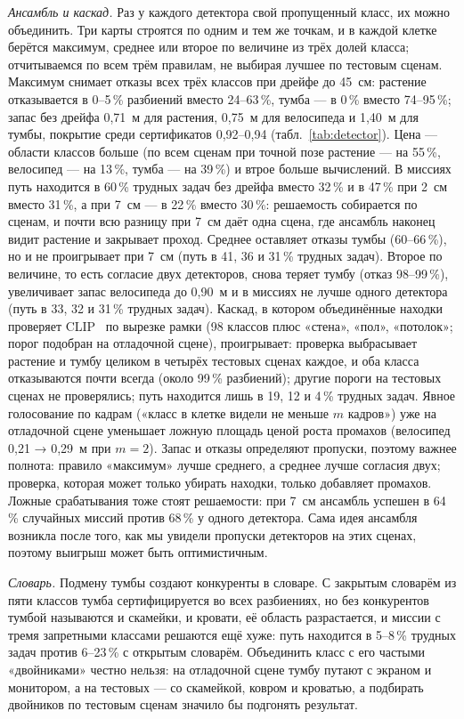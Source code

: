 \emph{Ансамбль и каскад.} Раз у каждого детектора свой пропущенный класс, их можно объединить. Три карты строятся по одним и тем же точкам, и в каждой клетке берётся максимум, среднее или второе по величине из трёх долей класса; отчитываемся по всем трём правилам, не выбирая лучшее по тестовым сценам. Максимум снимает отказы всех трёх классов при дрейфе до 45~см: растение отказывается в 0--5\,\% разбиений вместо 24--63\,\%, тумба --- в 0\,\% вместо 74--95\,\%; запас без дрейфа 0,71~м для растения, 0,75~м для велосипеда и 1,40~м для тумбы, покрытие среди сертификатов 0,92--0,94 (табл.~\ref{tab:detector}). Цена --- области классов больше (по всем сценам при точной позе растение --- на 55\,\%, велосипед --- на 13\,\%, тумба --- на 39\,\%) и втрое больше вычислений. В миссиях путь находится в 60\,\% трудных задач без дрейфа вместо 32\,\% и в 47\,\% при 2~см вместо 31\,\%, а при 7~см --- в 22\,\% вместо 30\,\%: решаемость собирается по сценам, и почти всю разницу при 7~см даёт одна сцена, где ансамбль наконец видит растение и закрывает проход. Среднее оставляет отказы тумбы (60--66\,\%), но и не проигрывает при 7~см (путь в 41, 36 и 31\,\% трудных задач). Второе по величине, то есть согласие двух детекторов, снова теряет тумбу (отказ 98--99\,\%), увеличивает запас велосипеда до 0,90~м и в миссиях не лучше одного детектора (путь в 33, 32 и 31\,\% трудных задач). Каскад, в котором объединённые находки проверяет CLIP~\cite{clip} по вырезке рамки (98 классов плюс «стена», «пол», «потолок»; порог подобран на отладочной сцене), проигрывает: проверка выбрасывает растение и тумбу целиком в четырёх тестовых сценах каждое, и оба класса отказываются почти всегда (около 99\,\% разбиений); другие пороги на тестовых сценах не проверялись; путь находится лишь в 19, 12 и 4\,\% трудных задач. Явное голосование по кадрам («класс в клетке видели не меньше $m$ кадров») уже на отладочной сцене уменьшает ложную площадь ценой роста промахов (велосипед 0,21 → 0,29~м при $m = 2$). Запас и отказы определяют пропуски, поэтому важнее полнота: правило «максимум» лучше среднего, а среднее лучше согласия двух; проверка, которая может только убирать находки, только добавляет промахов. Ложные срабатывания тоже стоят решаемости: при 7~см ансамбль успешен в 64\,\% случайных миссий против 68\,\% у одного детектора. Сама идея ансамбля возникла после того, как мы увидели пропуски детекторов на этих сценах, поэтому выигрыш может быть оптимистичным.

\emph{Словарь.} Подмену тумбы создают конкуренты в словаре. С закрытым словарём из пяти классов тумба сертифицируется во всех разбиениях, но без конкурентов тумбой называются и скамейки, и кровати, её область разрастается, и миссии с тремя запретными классами решаются ещё хуже: путь находится в 5--8\,\% трудных задач против 6--23\,\% с открытым словарём. Объединить класс с его частыми «двойниками» честно нельзя: на отладочной сцене тумбу путают с экраном и монитором, а на тестовых --- со скамейкой, ковром и кроватью, а подбирать двойников по тестовым сценам значило бы подгонять результат.

